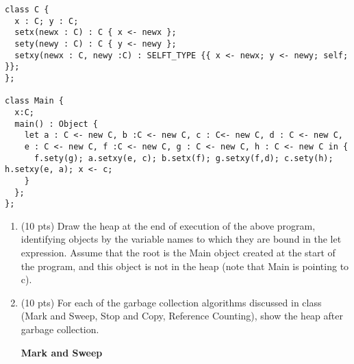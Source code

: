 \documentclass[10pt]{article}
\begin{document}
\begin{enumerate}
\begin{verbatim}
class C {
  x : C; y : C;
  setx(newx : C) : C { x <- newx };
  sety(newy : C) : C { y <- newy };
  setxy(newx : C, newy :C) : SELFT_TYPE {{ x <- newx; y <- newy; self; }};
};

class Main {
  x:C;
  main() : Object {
    let a : C <- new C, b :C <- new C, c : C<- new C, d : C <- new C,
    e : C <- new C, f :C <- new C, g : C <- new C, h : C <- new C in {
      f.sety(g); a.setxy(e, c); b.setx(f); g.setxy(f,d); c.sety(h); h.setxy(e, a); x <- c;
    }
  };
};
\end{verbatim}
\begin{enumerate}
  \item (10 pts) Draw the heap at the end of execution of the above program, identifying objects by the variable names to which they are bound in the let expression. Assume that the root is the Main object created at the start of the program, and this object is not in the heap (note that Main is pointing to c).

\begin{center}\end{center}

  \item (10 pts) For each of the garbage collection algorithms discussed in class (Mark and Sweep, Stop and Copy, Reference Counting), show the heap after garbage collection.

\textbf{Mark and Sweep} \\
\begin{center}\end{center}


\end{enumerate}
\end{enumerate}
\end{document}
